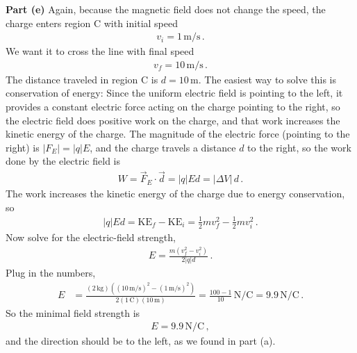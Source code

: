 \documentclass[11pt]{article}
\begin{document}
\noindent\textbf{Part (e)} Again, because the magnetic field does not change the speed, the charge enters region C with initial speed
\begin{align*}
v_i = 1\,\text{m/s}\,.
\end{align*}
We want it to cross the line with final speed
\begin{align*}
v_f = 10\,\text{m/s}\,.
\end{align*}
The distance traveled in region C is $d=10\,$m. The easiest way to solve this is conservation of energy: Since the uniform electric field is pointing to the left, it provides a constant electric force acting on the charge pointing to the right, so the electric field does positive work on the charge, and that work increases the kinetic energy of the charge. The magnitude of the electric force (pointing to the right) is $|F_E| = |q|E$, and the charge travels a distance $d$ to the right, so the work done by the electric field is 
\begin{align*}
W = \vec{F}_E\cdot\vec{d} = |q|Ed = |\Delta V| \, d\,.
\end{align*}
The work increases the kinetic energy of the charge due to energy conservation, so
\begin{align*}
|q|Ed =\text{KE}_f - \text{KE}_i= \frac{1}{2}mv_f^2 - \frac{1}{2}mv_i^2\,.
\end{align*}
Now solve for the electric-field strength,
\begin{align*}
E = \frac{m(v_f^2-v_i^2)}{2|q|d}\,.
\end{align*}
Plug in the numbers,
\begin{align*}
E &= \frac{(2\,\text{kg})\left((10\,\text{m/s})^2-(1\,\text{m/s})^2\right)}{2(1\,\text{C})(10\,\text{m})}= \frac{100-1}{10}\,\text{N/C}
= 9.9\,\text{N/C}\,.
\end{align*}
So the minimal field strength is
\begin{align*}
E = 9.9\,\text{N/C}\,,
\end{align*}
and the direction should be to the left, as we found in part (a).\\
\end{document}
